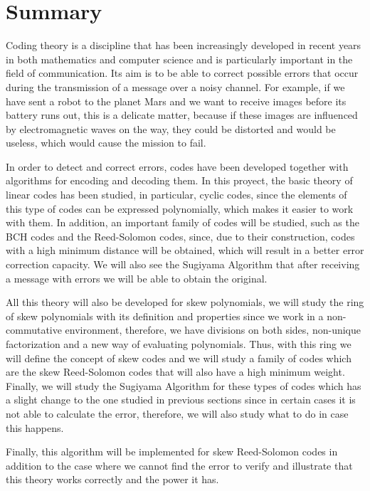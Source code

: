 

\chapter*{Summary}


Coding theory is a discipline that has been increasingly developed in recent years in both mathematics and computer science and is particularly important in the field of communication. Its aim is to be able to correct possible errors that occur during the transmission of a message over a noisy channel. For example, if we have sent a robot to the planet Mars and we want to receive images before its battery runs out, this is a delicate matter, because if these images are influenced by electromagnetic waves on the way, they could be distorted and would be useless, which would cause the mission to fail.

In order to detect and correct errors, codes have been developed together with algorithms for encoding and decoding them. In this proyect, the basic theory of linear codes has been studied, in particular, cyclic codes, since the elements of this type of codes can be expressed polynomially, which makes it easier to work with them. In addition, an important family of codes will be studied, such as the BCH codes and the Reed-Solomon codes, since, due to their construction, codes with a high minimum distance will be obtained, which will result in a better error correction capacity. We will also see the Sugiyama Algorithm that after receiving a message with errors we will be able to obtain the original. 

All this theory will also be developed for skew polynomials, we will study the ring of skew polynomials with its definition and properties since we work in a non-commutative environment, therefore, we have divisions on both sides, non-unique factorization and a new way of evaluating polynomials. Thus, with this ring we will define the concept of skew codes and we will study a family of codes which are the skew Reed-Solomon codes that will also have a high minimum weight. Finally, we will study the Sugiyama Algorithm for these types of codes which has a slight change to the one studied in previous sections since in certain cases it is not able to calculate the error, therefore, we will also study what to do in case this happens.

Finally, this algorithm will be implemented for skew Reed-Solomon codes in addition to the case where we cannot find the error to verify and illustrate that this theory works correctly and the power it has.

